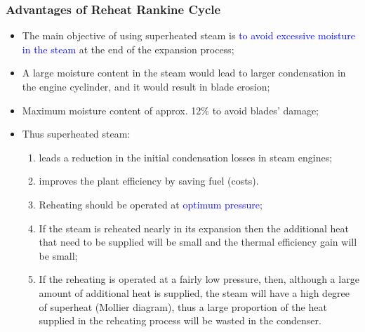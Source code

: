 \documentclass[10pt,compress,handout,ignorenonframetext]{beamer}
\begin{document}
\begin{frame}
 \frametitle{Advantages of Reheat Rankine Cycle}
  \begin{itemize}
   \item <1-> The main objective of using superheated steam is \textcolor{blue}{to avoid excessive moisture in the steam} at the end of the expansion process;
   \item <2-> A large moisture content in the steam would lead to larger condensation in the engine cyclinder, and it would result in blade erosion;
   \item <3-> Maximum moisture content of approx. 12$\%$ to avoid blades' damage;
   \item <4-> Thus superheated steam:
   \begin{enumerate}
    \item <5-> leads a reduction in the initial condensation losses in steam engines;
    \item <6-> improves the plant efficiency by saving fuel (costs).
    \item <7-> Reheating should be operated at \textcolor{blue}{optimum pressure};
    \item <8-> If the steam is reheated nearly in its expansion then the additional heat that need to be supplied will be small and the thermal efficiency gain will be small;
    \item <9-> If the reheating is operated at a fairly low pressure, then, although a large amount of additional heat is supplied, the steam will have a high degree of superheat (Mollier diagram), thus a large proportion of the heat supplied in the reheating process will be wasted in the condenser.
   \end{enumerate}
  \end{itemize}
 
\end{frame}
\end{document}

